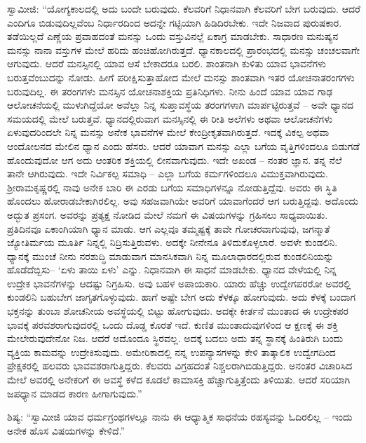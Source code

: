  ಸ್ವಾಮೀಜಿ: “ಯೋಗ್ಯಕಾಲದಲ್ಲಿ ಅದು ಬಂದೇ ಬರುವುದು. ಕೆಲವರಿಗೆ ನಿಧಾನವಾಗಿ ಕೆಲವರಿಗೆ ಬೇಗ ಬರುವುದು. ಆದರೆ ಎಂದಿಗೂ ಬಿಡುವುದಿಲ್ಲವೆಂಬ ನಿರ್ಧಾರದಿಂದ ಅದನ್ನೇ ಗಟ್ಟಿಯಾಗಿ ಹಿಡಿದಿರಬೇಕು. ಇದೇ ನಿಜವಾದ ಪುರುಷಕಾರ. ತಡೆಯಿಲ್ಲದೆ ಎಣ್ಣೆಯ ಪ್ರವಾಹದಂತೆ ಮನಸ್ಸು ಒಂದು ವಸ್ತುವಿನಲ್ಲೆ ಏಕಾಗ್ರ ಮಾಡಬೇಕು. ಸಾಧಾರಣ ಮನುಷ್ಯನ ಮನಸ್ಸು ನಾನಾ ವಸ್ತುಗಳ ಮೇಲೆ ಹರಿದು ಹಂಚಿಹೋಗಿರುತ್ತದೆ. ಧ್ಯಾನಕಾಲದಲ್ಲಿ ಪ್ರಾರಂಭದಲ್ಲಿ ಮನಸ್ಸು ಚಂಚಲವಾಗೇ ಆಗುವುದು. ಆದರೆ ಮನಸ್ಸಿನಲ್ಲಿ ಯಾವ ಆಸೆ ಬೇಕಾದರೂ ಬರಲಿ. ಶಾಂತನಾಗಿ ಕುಳಿತು ಯಾವ ಭಾವನೆಗಳು ಬರುತ್ತವೆಂಬುದನ್ನು ನೋಡು. ಹೀಗೆ ಪರೀಕ್ಷಿಸುತ್ತಾಹೋದ ಮೇಲೆ ಮನಸ್ಸು ಶಾಂತವಾಗಿ ಇತರ ಯೋಚನಾತರಂಗಗಳು ಬರುವುದಿಲ್ಲ. ಈ ತರಂಗಗಳು ಮನಸ್ಸಿನ ಯೋಚನಾಶಕ್ತಿಯ ಪ್ರತಿನಿಧಿಗಳು. ನೀನು ಹಿಂದೆ ಯಾವ ಯಾವ ಗಾಢ ಆಲೋಚನೆಯಲ್ಲಿ ಮುಳುಗಿದ್ದೆಯೋ ಅವೆಲ್ಲಾ ನಿನ್ನ ಸುಪ್ತಾವಸ್ಥೆಯ ತರಂಗಗಳಾಗಿ ಮಾರ್ಪಟ್ಟಿರುತ್ತವೆ – ಅವೇ ಧ್ಯಾನದ ಸಮಯದಲ್ಲಿ ಮೇಲೆ ಬರುತ್ತವೆ. ಧ್ಯಾನದಲ್ಲಿರುವಾಗ ಮನಸ್ಸಿನಲ್ಲಿ ಈ ರೀತಿ ಅಲೆಗಳು ಅಥವಾ ಆಲೋಚನೆಗಳು ಏಳುವುದರಿಂದಲೇ ನಿನ್ನ ಮನಸ್ಸು ಅನೇಕ ಭಾವನೆಗಳ ಮೇಲೆ ಕೇಂದ್ರೀಕೃತವಾಗಿರುತ್ತದೆ. ಇದಕ್ಕೆ ವಿಕಲ್ಪ ಅಥವಾ ಆಂದೋಲನದ ಮೇಲಿನ ಧ್ಯಾನ ಎಂದು ಹೆಸರು. ಆದರೆ ಯಾವಾಗ ಮನಸ್ಸು ಎಲ್ಲಾ ಬಗೆಯ ವೃತ್ತಿಗಳಿಂದಲೂ ಬಿಡುಗಡೆ ಹೊಂದುವುದೋ ಆಗ ಅದು ಆಂತರಿಕ ಶಕ್ತಿಯಲ್ಲಿ ಲೀನವಾಗುವುದು. ಇದೇ ಅಖಂಡ – ನಂತರ ಜ್ಞಾನ. ತನ್ನ ನೆಲೆ ತಾನೇ ಆಗಿರುವುದು. ಇದೇ ನಿರ್ವಿಕಲ್ಪ ಸಮಾಧಿ – ಎಲ್ಲಾ ಬಗೆಯ ಕರ್ಮಗಳಿಂದಲೂ ವಿಮುಕ್ತವಾಗಿರುವುದು. ಶ‍್ರೀರಾಮಕೃಷ್ಣರಲ್ಲಿ ನಾವು ಅನೇಕ ಬಾರಿ ಈ ಎರಡು ಬಗೆಯ ಸಮಾಧಿಗಳನ್ನೂ ನೋಡುತ್ತಿದ್ದೆವು. ಅವರು ಈ ಸ್ಥಿತಿ ಹೊಂದಲು ಹೋರಾಡಬೇಕಾಗಿರಲಿಲ್ಲ. ಅವು ಸಹಜವಾಗಿಯೇ ಅವರಿಗೆ ಯಾವಾಗೆಂದರೆ ಆಗ ಬರುತ್ತಿದ್ದವು. ಅದೊಂದು ಅದ್ಭುತ ಪ್ರಸಂಗ. ಅವರನ್ನು ಪ್ರತ್ಯಕ್ಷ ನೋಡಿದ ಮೇಲೆ ನಮಗೆ ಈ ವಿಷಯಗಳನ್ನು ಗ್ರಹಿಸಲು ಸಾಧ್ಯವಾಯಿತು. ಪ್ರತಿದಿನವೂ ಏಕಾಂಗಿಯಾಗಿ ಧ್ಯಾನ ಮಾಡು. ಆಗ ಎಲ್ಲವೂ ತಮ್ಮಷ್ಟಕ್ಕೆ ತಾವೇ ಗೋಚರವಾಗುವುವು, ಜಗನ್ಮಾತೆ ಜ್ಯೋತಿರ್ಮಯ ಮೂರ್ತಿ ನಿನ್ನಲ್ಲಿ ನಿದ್ರಿಸುತ್ತಿರುವಳು. ಅದಕ್ಕೇ ನೀನೇನೂ ತಿಳಿದುಕೊಳ್ಳಲಾರೆ. ಅವಳೇ ಕುಂಡಲಿನಿ. ಧ್ಯಾನಕ್ಕೆ ಮುಂಚೆ ನೀನು ನರಶುದ್ಧಿ ಮಾಡುವಾಗ ಮಾನಸಿಕವಾಗಿ ನಿನ್ನ ಮೂಲಾಧಾರದಲ್ಲಿರುವ ಕುಂಡಲಿನಿಯನ್ನು ಹೊಡೆದೆಬ್ಬಿಸು– ‘ಏಳು ತಾಯಿ ಏಳು’ ಎನ್ನು. ನಿಧಾನವಾಗಿ ಈ ಸಾಧನೆ ಮಾಡಬೇಕು. ಧ್ಯಾನದ ವೇಳೆಯಲ್ಲಿ ನಿನ್ನ ಉದ್ರೇಕ ಭಾವನೆಗಳನ್ನು ಆದಷ್ಟು ನಿಗ್ರಹಿಸು. ಅವು ಬಹಳ ಅಪಾಯಕಾರಿ. ಯಾರು ಹೆಚ್ಚು ಉದ್ವೇಗಪರರೋ ಅವರಲ್ಲಿ ಕುಂಡಲಿನಿ ಬಹುಬೇಗ ಜಾಗೃತಗೊಳ್ಳುವುದು. ಹಾಗೆ ಅಷ್ಟೇ ಬೇಗ ಅದು ಕೆಳಕ್ಕೂ ಹೋಗುವುದು. ಅದು ಕೆಳಕ್ಕೆ ಬಂದಾಗ ಭಕ್ತನನ್ನು ತುಂಬಾ ಶೋಚನೀಯ ಅವಸ್ಥೆಯಲ್ಲಿ ಬಿಟ್ಟು ಹೋಗುವುದು. ಅದಕ್ಕೇ ಕೀರ್ತನೆ ಮುಂತಾದ ಈ ಉದ್ರೇಕಪರ ಭಾವಕ್ಕೆ ಪರವಶರಾಗುವುದರಲ್ಲಿ ಒಂದು ದೊಡ್ಡ ಕೊರತೆ ಇದೆ. ಕುಣಿತ ಮುಂತಾದುವುಗಳಿಂದ ಆ ಕ್ಷಣಕ್ಕೆ ಈ ಶಕ್ತಿ ಮೇಲೇರುವುದೇನೋ ನಿಜ. ಆದರೆ ಅದೊಂದೂ ಸ್ಥಿರವಲ್ಲ. ಅದಕ್ಕೆ ಬದಲು ಅದು ತನ್ನ ಸ್ಥಾನಕ್ಕೆ ಹಿಂತಿರುಗಿ ಬಂದು ವ್ಯಕ್ತಿಯ ಕಾಮವನ್ನು ಉದ್ರೇಕಿಸುವುದು. ಅಮೇರಿಕಾದಲ್ಲಿ ನನ್ನ ಉಪನ್ಯಾಸಗಳನ್ನು ಕೇಳಿ ತಾತ್ಕಾಲಿಕ ಉದ್ವೇಗದಿಂದ ಪ್ರೇಕ್ಷಕರಲ್ಲಿ ಹಲವರು ಭಾವವಶರಾಗುತ್ತಿದ್ದರು. ಕೆಲವರು ವಿಗ್ರಹದಂತೆ ನಿಶ್ಚಲರಾಗಿಬಿಡುತ್ತಿದ್ದರು. ಅನಂತರ ವಿಚಾರಿಸಿದ ಮೇಲೆ ಅವರಲ್ಲಿ ಅನೇಕರಿಗೆ ಈ ಅವಸ್ಥೆ ಕಳೆದ ಕೂಡಲೆ ಕಾಮಾಸಕ್ತಿ ಹೆಚ್ಚಾಗುತ್ತಿತ್ತೆಂದು ತಿಳಿಯಿತು. ಆದರೆ ಸರಿಯಾಗಿ ಜಪಧ್ಯಾನ ಮಾಡದ ಕಾರಣ ಹೀಗಾಗುವುದು.” 

 ಶಿಷ್ಯ: “ಸ್ವಾಮೀಜಿ ಯಾವ ಧರ್ಮಗ್ರಂಥಗಳಲ್ಲೂ ನಾನು ಈ ಆಧ್ಯಾತ್ಮಿಕ ಸಾಧನೆಯ ರಹಸ್ಯವನ್ನು ಓದಿರಲಿಲ್ಲ – ಇಂದು ಅನೇಕ ಹೊಸ ವಿಷಯಗಳನ್ನು ಕೇಳಿದೆ.” 

